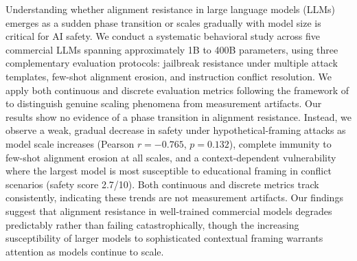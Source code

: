 Understanding whether alignment resistance in large language models (LLMs) emerges as a sudden phase transition or scales gradually with model size is critical for AI safety. We conduct a systematic behavioral study across five commercial LLMs spanning approximately 1B to 400B parameters, using three complementary evaluation protocols: jailbreak resistance under multiple attack templates, few-shot alignment erosion, and instruction conflict resolution. We apply both continuous and discrete evaluation metrics following the framework of \citet{schaeffer2023emergent} to distinguish genuine scaling phenomena from measurement artifacts. Our results show no evidence of a phase transition in alignment resistance. Instead, we observe a weak, gradual decrease in safety under hypothetical-framing attacks as model scale increases (Pearson $r = -0.765$, $p = 0.132$), complete immunity to few-shot alignment erosion at all scales, and a context-dependent vulnerability where the largest model is most susceptible to educational framing in conflict scenarios (safety score 2.7/10). Both continuous and discrete metrics track consistently, indicating these trends are not measurement artifacts. Our findings suggest that alignment resistance in well-trained commercial models degrades predictably rather than failing catastrophically, though the increasing susceptibility of larger models to sophisticated contextual framing warrants attention as models continue to scale.
